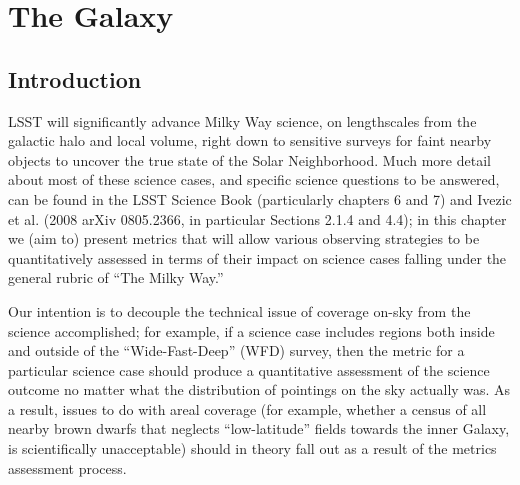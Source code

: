 \chapter[The Galaxy]{The Galaxy}
\def\chpname{galaxy}\label{chp:\chpname}



\section{Introduction}
\def\secname{intro}\label{sec:\secname}


LSST will significantly advance Milky Way science, on lengthscales
from the galactic halo and local volume, right down to sensitive
surveys for faint nearby objects to uncover the true state of the
Solar Neighborhood.
Much more detail about most of these science cases, and specific
science questions to be answered, can be found in the LSST Science
Book (particularly chapters 6 and 7) and Ivezic et al. (2008 arXiv
0805.2366, in particular Sections 2.1.4 and 4.4); in this chapter we
(aim to) present metrics that will allow various observing strategies
to be quantitatively assessed in terms of their impact on science
cases falling under the general rubric of ``The Milky Way.''  

Our intention is to decouple the technical issue of coverage on-sky
from the science accomplished; for example, if a science case includes
regions both inside and outside of the ``Wide-Fast-Deep'' (WFD)
survey, then the metric for a particular science case should produce a
quantitative assessment of the science outcome no matter what the
distribution of pointings on the sky actually was. As a result, issues
to do with areal coverage (for example, whether a census of all nearby
brown dwarfs that neglects ``low-latitude'' fields towards the inner
Galaxy, is scientifically unacceptable) should in theory fall out as a
result of the metrics assessment process.

